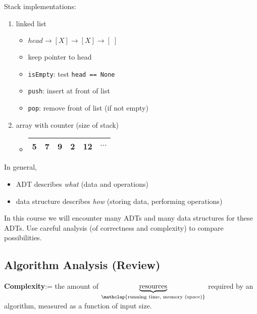 \noindent Stack implementations:
\begin{enumerate}[label={(\alph*)}]
    \item linked list
        \begin{itemize}
            \item $head \rightarrow [X] \rightarrow [X] \rightarrow [\;]$
            \item keep pointer to head
            \item \texttt{isEmpty}: test \texttt{head == None}
            \item \texttt{push}: insert at front of list
            \item \texttt{pop}: remove front of list (if not empty)
        \end{itemize}
    \item array with counter (size of stack)
        \begin{itemize}
            \item[] \begin{tabular}{| l | l | l | l | l | l |}
                    \hline 5 & 7 & 9 & 2 & 12 & $\cdots$ \\ \hline
                \end{tabular}
        \end{itemize}
\end{enumerate}

\noindent In general,
\begin{itemize}
    \item ADT describes \textit{what} (data and operations)
    \item data structure describes \textit{how} (storing data, performing
        operations)
\end{itemize}

\noindent In this course we will encounter many ADTs and many data structures
for these ADTs. Use careful analysis (of correctness and complexity) to compare
possibilities.

\subsection*{Algorithm Analysis (Review)}

\noindent \textbf{Complexity}:= the amount of
$\underbrace{\textrm{resources}}_{\mathclap{\text{running time, memory
(space)}}}$ required by an algorithm, measured as a function of input size.

